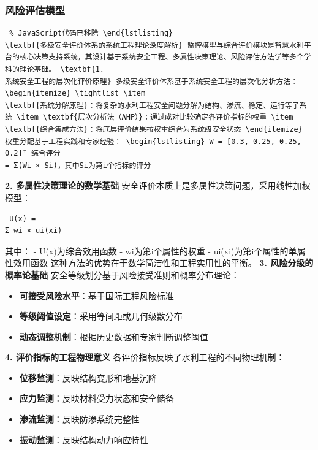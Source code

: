 \subsubsection{风险评估模型}\label{ux98ceux9669ux8bc4ux4f30ux6a21ux578b} \begin{lstlisting} % JavaScript代码已移除 \end{lstlisting}
\textbf{多级安全评价体系的系统工程理论深度解析} 监控模型与综合评价模块是智慧水利平台的核心决策支持系统，其设计基于系统安全工程、多属性决策理论、风险评估方法学等多个学科的理论基础。 \textbf{1.
系统安全工程的层次化评价原理} 多级安全评价体系基于系统安全工程的层次化分析方法： \begin{itemize} \tightlist \item
\textbf{系统分解原理}：将复杂的水利工程安全问题分解为结构、渗流、稳定、运行等子系统 \item \textbf{层次分析法（AHP）}：通过成对比较确定各评价指标的权重 \item
\textbf{综合集成方法}：将底层评价结果按权重综合为系统级安全状态 \end{itemize} 权重分配基于工程实践和专家经验： \begin{lstlisting} W = [0.3, 0.25, 0.25, 0.2]ᵀ 综合评分
= Σ(Wi × Si)，其中Si为第i个指标的评分 \end{lstlisting} \textbf{2. 多属性决策理论的数学基础} 安全评价本质上是多属性决策问题，采用线性加权模型： \begin{lstlisting} U(x) =
Σ wi × ui(xi) \end{lstlisting} 其中： - U(x)为综合效用函数 - wi为第i个属性的权重 - ui(xi)为第i个属性的单属性效用函数 这种方法的优势在于数学简洁性和工程实用性的平衡。
\textbf{3. 风险分级的概率论基础} 安全等级划分基于风险接受准则和概率分布理论： \begin{itemize} \tightlist \item \textbf{可接受风险水平}：基于国际工程风险标准 \item
\textbf{等级阈值设定}：采用等间距或几何级数分布 \item \textbf{动态调整机制}：根据历史数据和专家判断调整阈值 \end{itemize} \textbf{4. 评价指标的工程物理意义}
各评价指标反映了水利工程的不同物理机制： \begin{itemize} \tightlist \item \textbf{位移监测}：反映结构变形和地基沉降 \item \textbf{应力监测}：反映材料受力状态和安全储备\\
\item \textbf{渗流监测}：反映防渗系统完整性 \item \textbf{振动监测}：反映结构动力响应特性 \end{itemize}
